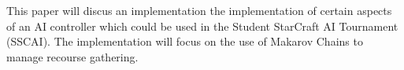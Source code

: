 This paper will discus an implementation the implementation of certain aspects of an AI controller which could be used in the Student StarCraft AI Tournament (SSCAI).\cite{sscai} The implementation will focus on the use of Makarov Chains to manage recourse gathering.